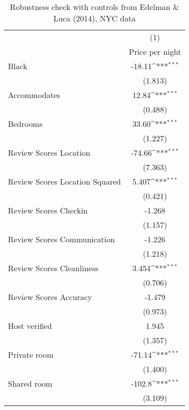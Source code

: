 {
\def\sym#1{\ifmmode^{#1}\else\(^{#1}\)\fi}
\begin{longtable}{l*{1}{c}}
\caption{Robustness check with controls from Edelman \& Luca (2014), NYC data}\\
\hline\hline\endfirsthead\hline\endhead\hline\endfoot\endlastfoot
                    &\multicolumn{1}{c}{(1)}\\
                    &\multicolumn{1}{c}{Price per night}\\
\hline
Black               &      -18.11\sym{***}\\
                    &     (1.813)         \\
[1em]
Accommodates        &       12.84\sym{***}\\
                    &     (0.488)         \\
[1em]
Bedrooms            &       33.60\sym{***}\\
                    &     (1.227)         \\
[1em]
Review Scores Location&      -74.66\sym{***}\\
                    &     (7.363)         \\
[1em]
Review Scores Location Squared           &       5.407\sym{***}\\
                    &     (0.421)         \\
[1em]
Review Scores Checkin&      -1.268         \\
                    &     (1.157)         \\
[1em]
Review Scores Communication&      -1.226         \\
                    &     (1.218)         \\
[1em]
Review Scores Cleanliness&       3.454\sym{***}\\
                    &     (0.706)         \\
[1em]
Review Scores Accuracy&      -1.479         \\
                    &     (0.973)         \\
[1em]
Host verified &       1.945         \\
                    &     (1.357)         \\
[1em]
Private room        &      -71.14\sym{***}\\
                    &     (1.400)         \\
[1em]
Shared room         &      -102.8\sym{***}\\
                    &     (3.109)         \\

\end{longtable}}
